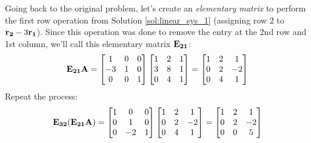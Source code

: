 \documentclass[../main.tex]{subfiles}
\begin{document}
\begin{solution}
	Going back to the original problem, let's create an \textit{elementary matrix} to perform the first
	row operation from Solution \ref{sol:linear_sys_1} (assigning row $2$ to $\mathbf{r_2}-3\mathbf{r_1}$).
	Since this operation was done to remove the entry at the 2nd row and 1st column, we'll call this elementary matrix $\mathbf{E_{21}}$:
	\[\mathbf{E_{21}}\mathbf{A}=\begin{bmatrix}1&0&0\\-3&1&0\\0&0&1\end{bmatrix}\begin{bmatrix}1&2&1\\3&8&1\\0&4&1\end{bmatrix}=\begin{bmatrix}1&2&1\\0&2&-2\\0&4&1\end{bmatrix}\]
	Repeat the process:
	\[\mathbf{E_{32}}(\mathbf{E_{21}\mathbf{A}})=\begin{bmatrix}1&0&0\\0&1&0\\0&-2&1\end{bmatrix}\begin{bmatrix}1&2&1\\0&2&-2\\0&4&1\end{bmatrix}=\begin{bmatrix}1&2&1\\0&2&-2\\0&0&5\end{bmatrix}\]
\end{solution}
\end{document}

